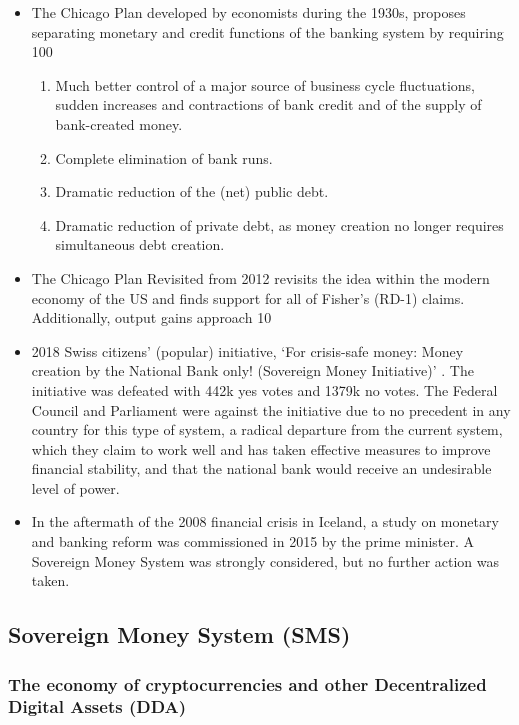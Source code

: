 \begin{itemize}
    \item The Chicago Plan \cite{fisher1936} developed by economists during the 1930s, proposes separating monetary and credit functions of the banking system by requiring 100%
    \begin{enumerate}
        \item Much better control of a major source of business cycle fluctuations, sudden increases and contractions of bank credit and of the supply of bank-created money.
        \item Complete elimination of bank runs.
        \item Dramatic reduction of the (net) public debt.
        \item Dramatic reduction of private debt, as money creation no longer requires simultaneous debt creation.
        \end{enumerate}
        \item The Chicago Plan Revisited \cite{chicagorevisited} from 2012 revisits the idea within the modern economy of the US and finds support for all of Fisher's (RD-1) claims. Additionally, output gains approach 10%
        \item 2018 Swiss citizens’ (popular) initiative, ‘For crisis-safe money: Money creation by the National Bank only! (Sovereign Money Initiative)’ \cite{SwizzInitiative}. The initiative was defeated with 442k yes votes and 1379k no votes. The Federal Council and Parliament were against the initiative due to no precedent in any country for this type of system, a radical departure from the current system, which they claim to work well and has taken effective measures to improve financial stability, and that the national bank would receive an undesirable level of power.
        \item In the aftermath of the 2008 financial crisis in Iceland, a study on monetary and banking reform \cite{IcelandReport} was commissioned in 2015 by the prime minister. A Sovereign Money System was strongly considered, but no further action was taken.
\end{itemize}

\subsection{Sovereign Money System (SMS)}

\subsubsection{The economy of cryptocurrencies and other Decentralized Digital Assets (DDA)}

